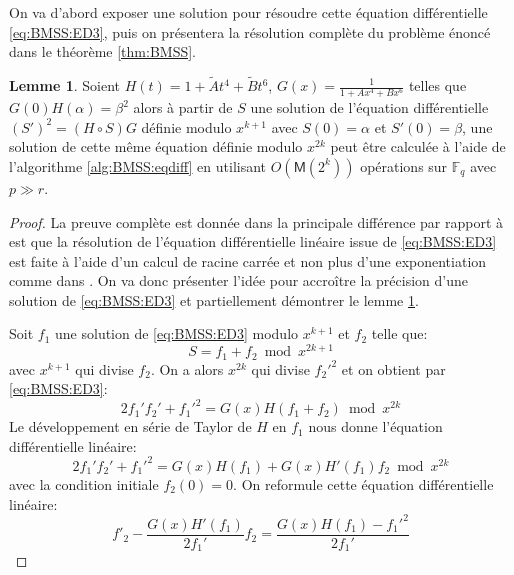 \documentclass[10pt,a4paper]{book}
\theoremstyle{plain}
\theoremstyle{definition}
\newtheorem{lem}[thm]{Lemme}
\theoremstyle{definition}
\theoremstyle{definition}
\theoremstyle{definition}
\theoremstyle{remark}
\theoremstyle{remark}
\theoremstyle{definition}
\begin{document}
On va d'abord exposer une solution pour résoudre cette équation différentielle \eqref{eq:BMSS:ED3}, puis on présentera la résolution complète du problème énoncé dans le théorème \ref{thm:BMSS}. 

\begin{lem}
\label{lem:BMSS}
Soient $H(t)=1+\tilde{A}t^4+\tilde{B}t^6$, $G(x)=\frac{1}{1+Ax^4+Bx^6}$ telles que $G(0)H(\alpha)=\beta^2$ alors à partir de $S$ une solution de l'équation différentielle $(S')^2=(H \circ S) G$ définie modulo $x^{k+1}$ avec $S(0)=\alpha$ et $S'(0)=\beta$, une solution de cette même équation définie modulo $x^{2k}$ peut être calculée à l'aide de l'algorithme \ref{alg:BMSS:eqdiff} en utilisant $O(\mathsf{M}(2^k))$ opérations sur $\mathbb{F}_q$ avec $p \gg r$.
\end{lem}

\begin{proof}
La preuve complète est donnée dans \cite{Lercier-Sirvent2008} la principale différence par rapport à \cite{BMSS08} est que la résolution de l'équation différentielle linéaire issue de \eqref{eq:BMSS:ED3} est faite à l'aide d'un calcul de racine carrée et non plus d'une exponentiation comme dans \cite{BMSS08}. 
On va donc présenter l'idée pour accroître la précision d'une solution de \eqref{eq:BMSS:ED3} et partiellement démontrer le lemme \ref{lem:BMSS}.

Soit $f_1$ une solution de \eqref{eq:BMSS:ED3} modulo $x^{k+1}$ et $f_2$ telle que:
\begin{equation}
S=f_1+f_2 \bmod x^{2k+1}
\end{equation}
avec $x^{k+1}$ qui divise $f_2$. On a alors $x^{2k}$ qui divise $f_2'^2$ et on obtient par \eqref{eq:BMSS:ED3}:
\begin{equation}
\label{eq:BMSS:ED4}
2f_1'f_2'+f_1'^2=G(x)H(f_1+f_2) \bmod x^{2k}
\end{equation}
Le développement en série de Taylor de $H$ en $f_1$ nous donne l'équation différentielle linéaire:
\begin{equation}
2f_1'f_2'+f_1'^2=G(x)H(f_1)+G(x)H'(f_1)f_2 \bmod x^{2k}
\end{equation}
avec la condition initiale $f_2(0)=0$. On reformule cette équation 
différentielle linéaire:
\begin{equation}
\label{eq:LS08:diflin}
f'_2-\frac{G(x)H'(f_1)}{2f_1'}f_2=\frac{G(x)H(f_1)-f_1'^2}{2f_1'}
\end{equation}


\end{proof}
\end{document}
